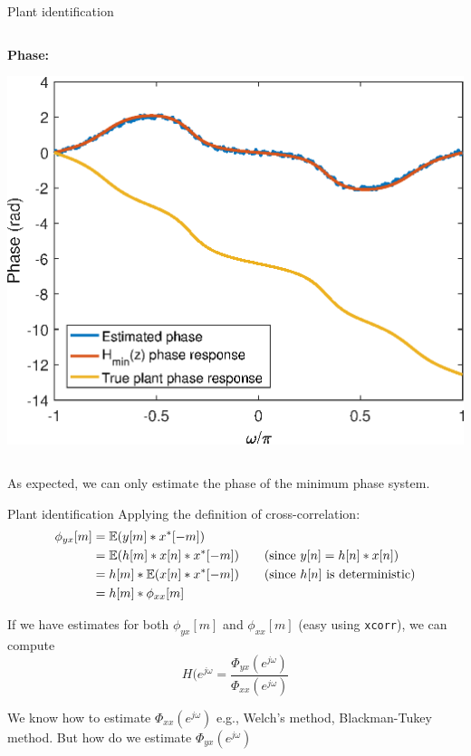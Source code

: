 \documentclass[10pt]{beamer}
\begin{document}
\begin{frame}{Plant identification}
\begin{columns}
	\begin{column}{0.5\textwidth}
	\textbf{Phase:}	
	\begin{center}
		\includegraphics[width=\textwidth]{../homework/figs/inverse_control_kramers_kronig_id_phase.eps}
	\end{center}
	\end{column}
\end{columns}

As expected, we can only estimate the phase of the minimum phase system.
\end{frame}

%
\begin{frame}{Plant identification}
Applying the definition of cross-correlation:
\begin{align*}
\phi_{yx}[m] &= \operatorname{\mathbb{E}}(y[m]\ast x^*[-m]) \\
&= \operatorname{\mathbb{E}}(h[m]\ast x[n] \ast x^*[-m]) \tag{since $y[n] = h[n]\ast x[n]$} \\
& = h[m]\ast \operatorname{\mathbb{E}}(x[n] \ast x^*[-m]) \tag{since $h[n]$ is deterministic} \\
& = h[m]\ast \phi_{xx}[m] \\
\end{align*}

If we have estimates for both $\phi_{yx}[m]$ and $\phi_{xx}[m]$ (easy using \texttt{xcorr}), we can compute
\begin{equation*}
H(e^{j\omega} = \frac{\Phi_{yx}(e^{j\omega})}{\Phi_{xx}(e^{j\omega})}
\end{equation*}

We know how to estimate $\Phi_{xx}(e^{j\omega})$ e.g., Welch's method, Blackman-Tukey method. But how do we estimate $\Phi_{yx}(e^{j\omega})$
\end{frame}
\end{document}
